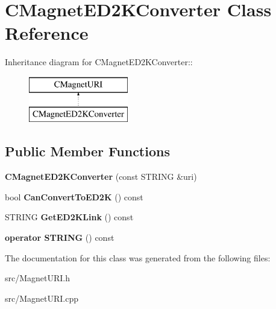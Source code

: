 \section{CMagnetED2KConverter Class Reference}
\label{classCMagnetED2KConverter}
Inheritance diagram for CMagnetED2KConverter::\begin{figure}[H]
\begin{center}
\leavevmode
\includegraphics[height=2cm]{classCMagnetED2KConverter}
\end{center}
\end{figure}
\subsection*{Public Member Functions}
\begin{DoxyCompactItemize}
\item 
{\bfseries CMagnetED2KConverter} (const STRING \&uri)\label{classCMagnetED2KConverter_a83da28de421187d29702635c77b4dd99}

\item 
bool {\bfseries CanConvertToED2K} () const \label{classCMagnetED2KConverter_a8d3405522c714979eed9da501800d085}

\item 
STRING {\bfseries GetED2KLink} () const \label{classCMagnetED2KConverter_a0ea93a696966b5ba915d693c582b2289}

\item 
{\bfseries operator STRING} () const \label{classCMagnetED2KConverter_ad88a5da165ff2c0008cd2b1963580c5f}

\end{DoxyCompactItemize}


The documentation for this class was generated from the following files:\begin{DoxyCompactItemize}
\item 
src/MagnetURI.h\item 
src/MagnetURI.cpp\end{DoxyCompactItemize}

